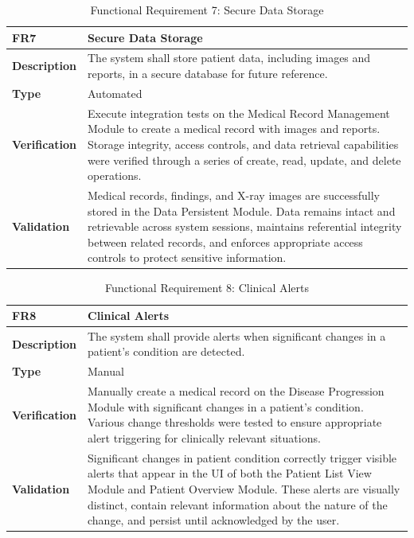 \documentclass[12pt, titlepage]{article}
\begin{document}
\begin{table}[h!]
\centering
{}
\begin{tabular}{|p{3.5cm}|p{11.5cm}|}
\hline
\rowcolor{gray!30}
\textbf{FR7} & \textbf{Secure Data Storage} \\
\hline
\textbf{Description} & The system shall store patient data, including images and reports, in a secure database for future reference.\\
\hline
\textbf{Type} & Automated \\
\hline
\textbf{Verification} & Execute integration tests on the Medical Record Management Module to create a medical record with images and reports. Storage integrity, access controls, and data retrieval capabilities were verified through a series of create, read, update, and delete operations. \\
\hline
\textbf{Validation} & Medical records, findings, and X-ray images are successfully stored in the Data Persistent Module. Data remains intact and retrievable across system sessions, maintains referential integrity between related records, and enforces appropriate access controls to protect sensitive information. \\
\hline
\end{tabular}
\caption{Functional Requirement 7: Secure Data Storage}
\end{table}

\begin{table}[h!]
\centering
{}
\begin{tabular}{|p{3.5cm}|p{11.5cm}|}
\hline
\rowcolor{gray!30}
\textbf{FR8} & \textbf{Clinical Alerts} \\
\hline
\textbf{Description} & The system shall provide alerts when significant changes in a patient's condition are detected.  \\
\hline
\textbf{Type} & Manual \\
\hline
\textbf{Verification} & Manually create a medical record on the Disease Progression Module with significant changes in a patient's condition. Various change thresholds were tested to ensure appropriate alert triggering for clinically relevant situations. \\
\hline
\textbf{Validation} & Significant changes in patient condition correctly trigger visible alerts that appear in the UI of both the Patient List View Module and Patient Overview Module. These alerts are visually distinct, contain relevant information about the nature of the change, and persist until acknowledged by the user. \\
\hline
\end{tabular}
\caption{Functional Requirement 8: Clinical Alerts}
\end{table}
\end{document}
